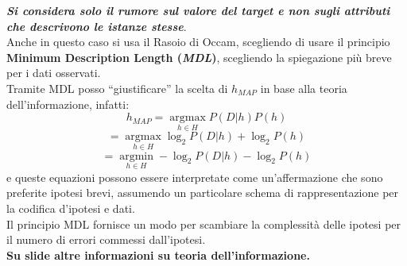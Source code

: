 \textbf{\textit{Si considera solo il rumore sul valore del target e non sugli
    attributi che descrivono le istanze stesse}}.\\
Anche in questo caso si usa il Rasoio di Occam, scegliendo di usare il principio
\textbf{Minimum Description Length (\textit{MDL})}, scegliendo la spiegazione
più breve per i dati osservati.\\
Tramite MDL posso ``giustificare'' la scelta di $h_{MAP}$ in base alla teoria
dell'informazione, infatti:
\[h_{MAP}=\operatorname*{argmax}_{h\in H}P(D|h)P(h)\]
\[=\operatorname*{argmax}_{h\in H}\log_2P(D|h)+\log_2P(h)\]
\[=\operatorname*{argmin}_{h\in H}-\log_2P(D|h)-\log_2P(h)\]
e queste equazioni possono essere interpretate come un'affermazione che sono
preferite ipotesi brevi, assumendo un particolare schema di rappresentazione per
la codifica d'ipotesi e dati.\\
Il principio MDL fornisce un modo per scambiare la complessità delle ipotesi
per il numero di errori commessi dall'ipotesi.\\

\textbf{Su slide altre informazioni su teoria dell'informazione.}
